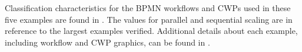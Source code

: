 Classification characteristics for the BPMN workflows and CWPs used in these five examples are found in . The values for parallel and sequential scaling are in reference to the largest examples verified. Additional details about each example, including workflow and CWP graphics, can be found in .

